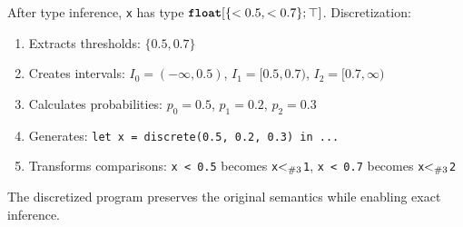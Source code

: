 After type inference, \texttt{x} has type $\text{\ttfamily\bfseries float}[\{<0.5, <0.7\}; \top]$. Discretization:
\begin{enumerate}
    \item Extracts thresholds: $\{0.5, 0.7\}$
    \item Creates intervals: $I_0 = (-\infty, 0.5)$, $I_1 = [0.5, 0.7)$, $I_2 = [0.7, \infty)$
    \item Calculates probabilities: $p_0 = 0.5$, $p_1 = 0.2$, $p_2 = 0.3$
    \item Generates: \texttt{let x = discrete(0.5, 0.2, 0.3) in ...}
    \item Transforms comparisons: \texttt{x < 0.5} becomes \texttt{x}$<_{\#{3}}$\texttt{1}, \texttt{x < 0.7} becomes \texttt{x}$<_{\#{3}}$\texttt{2}
\end{enumerate}

The discretized program preserves the original semantics while enabling exact inference.

